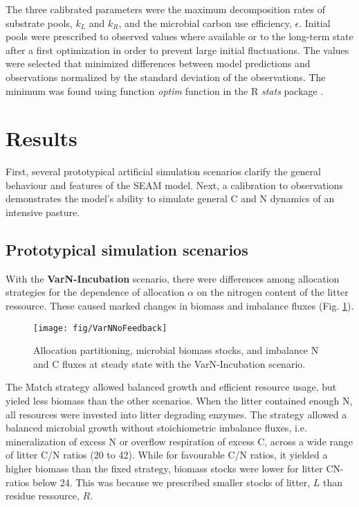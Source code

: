 The three calibrated parameters were the maximum decomposition rates of
substrate pools, $k_L$ and $k_R$, and the microbial carbon use efficiency,
$\epsilon$. Initial pools were prescribed to observed values where available or
to the long-term state after a first optimization in order to prevent large
initial fluctuations. The values were selected that minimized differences
between model predictions and observations normalized by the standard deviation
of the observations. The minimum was found using function \textit{optim}
function in the R \textit{stats} package \citep{R07}.
 
\section{Results}

First, several prototypical artificial simulation scenarios clarify the
general behaviour and features of the SEAM model. Next, a calibration to
observations demonstrates the model's ability to simulate general C and N
dynamics of an intensive pasture.

\subsection{Prototypical simulation scenarios}

With the \textbf{VarN-Incubation} scenario, there were differences among
allocation strategies for the dependence of allocation $\alpha$ on the nitrogen
content of the litter ressource. These caused marked changes in
biomass and imbalance fluxes (Fig.
\ref{fig:VarNNoFeedback}).

\begin{figure}[t]
\vspace*{2mm}
\begin{center}
\texttt{[image: fig/VarNNoFeedback]}
\end{center}
\caption{Allocation partitioning,
microbial biomass stocks, and imbalance N and C
fluxes at steady state with the VarN-Incubation scenario.
\label{fig:VarNNoFeedback}}
\end{figure}

The Match strategy allowed balanced growth and efficient resource usage, but
yieled less biomass than the other scenarios. When the litter contained enough
N, all resources were invested into litter degrading enzymes. The strategy
allowed a balanced microbial growth without stoichiometric imbalance fluxes,
i.e. mineralization of excess N or overflow respiration of excess C, across a
wide range of litter C/N ratios (20 to 42). While for favourable C/N ratios, it
yielded a higher biomass than the fixed strategy, biomass stocks were lower for
litter CN-ratios below 24. This was because we prescribed smaller stocks of
litter, $L$ than residue ressource, $R$.

